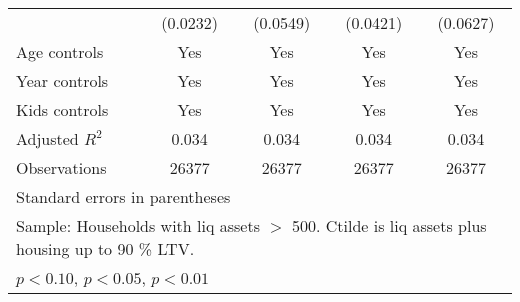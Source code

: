 {\begin{longtable}{l*{4}{c}}
                    &    (0.0232)         &    (0.0549)         &    (0.0421)         &    (0.0627)         \\
\addlinespace
Age controls        &         Yes         &         Yes         &         Yes         &         Yes         \\
\addlinespace
Year controls       &         Yes         &         Yes         &         Yes         &         Yes         \\
\addlinespace
Kids controls       &         Yes         &         Yes         &         Yes         &         Yes         \\
\midrule
Adjusted \(R^{2}\)  &       0.034         &       0.034         &       0.034         &       0.034         \\
Observations        &       26377         &       26377         &       26377         &       26377         \\
\bottomrule
\multicolumn{5}{l}{\footnotesize Standard errors in parentheses}\\
\multicolumn{5}{l}{\footnotesize Sample: Households with liq assets $>$ 500. Ctilde is liq assets plus housing up to 90 \% LTV.}\\
\multicolumn{5}{l}{\footnotesize \sym{*} \(p<0.10\), \sym{**} \(p<0.05\), \sym{***} \(p<0.01\)}\\
\end{longtable}
}
